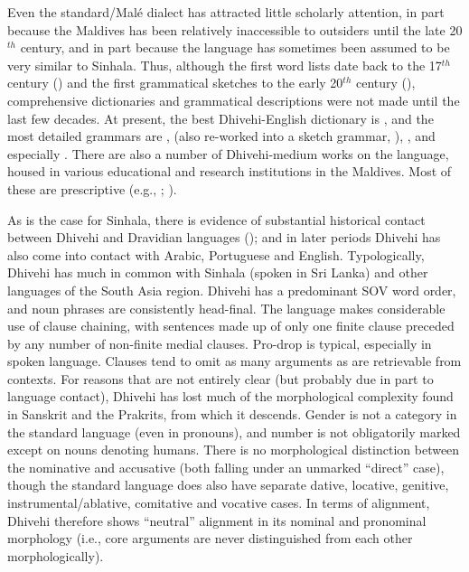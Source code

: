 \documentclass[output=paper]{langsci/langscibook}
\begin{document}
 Even the standard/Malé dialect has attracted little scholarly attention, in part because the Maldives has been relatively inaccessible to outsiders until the late 20$^{th}$ century, and in part because the language has sometimes been assumed to be very similar to Sinhala. Thus, although the first word lists date back to the 17$^{th}$ century (\citealt{Pyrard1619}) and the first grammatical sketches to the early 20$^{th}$ century (\citealt{Geiger1919}), comprehensive dictionaries and grammatical descriptions were not made until the last few decades. At present, the best Dhivehi-English dictionary is \cite{Reynolds2003}, and the most detailed grammars are \cite{Wijesundera1988}, \cite{Cain2000} (also re-worked into a sketch grammar, \citealt{CainGair2000}), \cite{Fritz2002}, and especially \cite{Gnanadesikan2017}. There are also a number of Dhivehi-medium works on the language, housed in various educational and research institutions in the Maldives. Most of these are prescriptive (e.g., \citealt{Ahmad1970}; \citealt{Saudiq2012}).

As is the case for Sinhala, there is evidence of substantial historical contact between Dhivehi and Dravidian languages (\citealt{Cain2000}); and in later periods Dhivehi has also come into contact with Arabic, Portuguese and English. Typologically, Dhivehi has much in common with Sinhala (spoken in Sri Lanka) and other languages of the South Asia region. Dhivehi has a predominant SOV word order, and noun phrases are consistently head-final. The language makes considerable use of clause chaining, with sentences made up of only one finite clause preceded by any number of non-finite medial clauses. Pro-drop is typical, especially in spoken language. Clauses tend to omit as many arguments as are retrievable from contexts. For reasons that are not entirely clear (but probably due in part to language contact), Dhivehi has lost much of the morphological complexity found in Sanskrit and the Prakrits, from which it descends. Gender is not a category in the standard language (even in pronouns), and number is not obligatorily marked except on nouns denoting humans. There is no morphological distinction between the nominative and accusative (both falling under an unmarked “direct” case), though the standard language does also have separate dative, locative, genitive, instrumental/ablative, comitative and vocative cases. In terms of alignment, Dhivehi therefore shows “neutral” alignment in its nominal and pronominal morphology (i.e., core arguments are never distinguished from each other morphologically).
\end{document}
